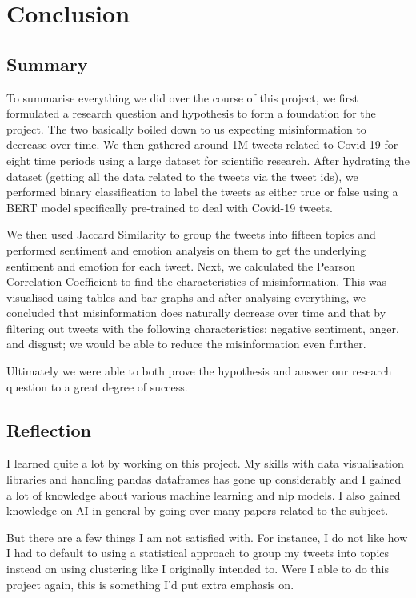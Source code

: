 \documentclass{l4proj}
\begin{document}
\chapter{Conclusion}    

\section{Summary}
To summarise everything we did over the course of this project, we first formulated a research question and hypothesis to form a foundation for the project. The two basically boiled down to us expecting misinformation to decrease over time. We then gathered around 1M tweets related to Covid-19 for eight time periods using a large dataset for scientific research. After hydrating the dataset (getting all the data related to the tweets via the tweet ids), we performed binary classification to label the tweets as either true or false using a BERT model specifically pre-trained to deal with Covid-19 tweets.

We then used Jaccard Similarity to group the tweets into fifteen topics and performed sentiment and emotion analysis on them to get the underlying sentiment and emotion for each tweet. Next, we calculated the Pearson Correlation Coefficient to find the characteristics of misinformation. This was visualised using tables and bar graphs and after analysing everything, we concluded that misinformation does naturally decrease over time and that by filtering out tweets with the following characteristics: negative sentiment, anger, and disgust; we would be able to reduce the misinformation even further.

Ultimately we were able to both prove the hypothesis and answer our research question to a great degree of success.

\section{Reflection}
I learned quite a lot by working on this project. My skills with data visualisation libraries and handling pandas dataframes has gone up considerably and I gained a lot of knowledge about various machine learning and nlp models. I also gained knowledge on AI in general by going over many papers related to the subject.

But there are a few things I am not satisfied with. For instance, I do not like how I had to default to using a statistical approach to group my tweets into topics instead on using clustering like I originally intended to. Were I able to do this project again, this is something I'd put extra emphasis on.
\end{document}

